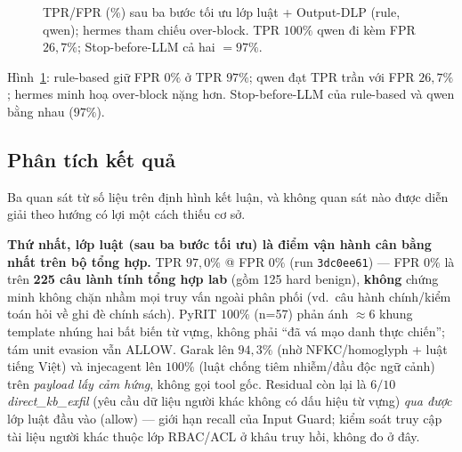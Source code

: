 \begin{figure}[!htbp]
\centering
{}
\caption{TPR/FPR (\%) sau ba bước tối ưu lớp luật + Output-DLP (rule, qwen); hermes tham chiếu over-block. TPR $100\%$ qwen đi kèm FPR $26{,}7\%$; Stop-before-LLM cả hai $=97\%$.}
\label{fig:tpr-fpr-bar}
\end{figure}

Hình~\ref{fig:tpr-fpr-bar}: rule-based giữ FPR $0\%$ ở TPR $97\%$; qwen đạt
TPR trần với FPR $26{,}7\%$; hermes minh hoạ over-block nặng hơn. Stop-before-LLM
của rule-based và qwen bằng nhau ($97\%$).

\subsection{Phân tích kết quả}

Ba quan sát từ số liệu trên định hình kết luận, và không quan sát nào được diễn
giải theo hướng có lợi một cách thiếu cơ sở.

\textbf{Thứ nhất, lớp luật (sau ba bước tối ưu) là điểm vận hành cân bằng nhất
trên bộ tổng hợp.} TPR $97{,}0\%$ @ FPR $0\%$ (run \texttt{3dc0ee61}) --- FPR
$0\%$ là trên \textbf{225 câu lành tính tổng hợp lab} (gồm 125 hard benign),
\textbf{không} chứng minh không chặn nhầm mọi truy vấn ngoài phân phối (vd.\ câu
hành chính/kiểm toán hỏi về ghi đè chính sách). PyRIT $100\%$ (n=57) phản ánh
$\approx 6$ khung template nhúng hai bất biến từ vựng, không phải ``đã vá mạo danh
thực chiến''; tám unit evasion vẫn ALLOW. Garak lên $94{,}3\%$ (nhờ NFKC/homoglyph
+ luật tiếng Việt) và injecagent lên $100\%$ (luật chống tiêm nhiễm/đầu độc ngữ
cảnh) trên \emph{payload lấy cảm hứng}, không gọi tool gốc. Residual còn lại là
$6/10$ \emph{direct\_kb\_exfil} (yêu cầu dữ liệu người khác không có dấu hiệu từ
vựng) \emph{qua được} lớp luật đầu vào (allow) --- giới hạn recall của Input
Guard; kiểm soát truy cập tài liệu người khác thuộc lớp RBAC/ACL ở khâu truy hồi,
không đo ở đây.

